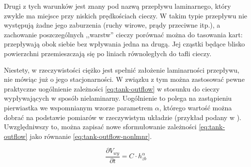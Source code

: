 Drugi z tych warunków jest znany pod nazwą przepływu laminarnego, który zwykle ma miejsce przy niskich prędkościach cieczy. W takim typie przepływu nie występują żadne jego zaburzenia (ruchy wirowe, prądy przeciwne itp.), a zachowanie poszczególnych ,,warstw'' cieczy porównać można do tasowania kart: przepływają obok siebie bez wpływania jedna na drugą. Jej cząstki będące blisko powierzchni przemieszczają się po liniach równoległych do tafli cieczy.

Niestety, w rzeczywistości ciężko jest spełnić założenie laminarności przepływu, nie mówiąc już o jego stacjonarności. W związku z tym można zastosować pewne praktyczne uogólnienie zależności \ref{eq:tank-outflow} w stosunku do cieczy wypływających w sposób nielaminarny. Uogólnienie to polega na zastąpieniu pierwiastka we wspomnianym wzorze parametrem $\alpha$, którego wartość można dobrać na podstawie pomiarów w rzeczywistym układzie (przykład podany w \cite{TanksManual}). Uwzględniwszy to, można zapisać nowe sformułowanie zależności \ref{eq:tank-outflow} jako równanie \ref{eq:tank-outflow-nonlmnr}.

\begin{equation}\label{eq:tank-outflow-nonlmnr}
    \frac{\partial V_{wy}}{\partial t} = C\cdot h_{zb}^{\alpha}
\end{equation}
